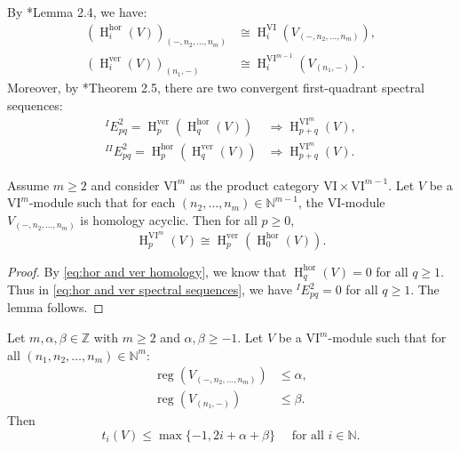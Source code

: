 \documentclass{amsart}
\numberwithin{equation}{section}
\DeclareMathOperator{\reg}{reg}
\DeclareMathOperator{\HH}{H}
\newcommand{\N}{{\mathbb{N}}}
\newcommand{\hor}{{\mathrm{hor}}}
\newcommand{\ver}{{\mathrm{ver}}}
\newcommand{\VI}{{\mathrm{VI}}}
\begin{document}
By \cite{gta}*{Lemma 2.4}, we have:
   \begin{equation} \label{eq:hor and ver homology}
      \begin{aligned}
         (\HH^\hor_i (V))_{(-, n_2, \ldots, n_m)} &\cong \HH^{\VI}_i(V_{(-, n_2, \ldots, n_m)}),\\
         (\HH^\ver_i (V))_{(n_1, -)} &\cong \HH^{\VI^{m-1}}_i(V_{(n_1, -)}).
      \end{aligned}
   \end{equation}
Moreover, by \cite{gta}*{Theorem 2.5}, there are two convergent first-quadrant spectral sequences:
   \begin{equation} \label{eq:hor and ver spectral sequences}
      \begin{aligned}
         ^{I}\!E^2_{pq} = \HH^\ver_p (\HH^\hor_q (V)) &\Rightarrow \HH^{\VI^m}_{p+q}(V),\\
         ^{II}\!E^2_{pq} = \HH^\hor_p (\HH^\ver_q (V)) &\Rightarrow \HH^{\VI^m}_{p+q}(V).
      \end{aligned}
   \end{equation}

\begin{lemma} \label{lem: spec seq degenerate}
   Assume $m\geqslant 2$ and consider $\VI^m$ as the product category $\VI\times \VI^{m-1}$. Let $V$ be a $\VI^m$-module such that for each $(n_2, \ldots, n_m)\in \N^{m-1}$, the $\VI$-module $V_{(-, n_2, \ldots, n_m)}$ is homology acyclic. Then for all $p\geqslant 0$, 
   \[ \HH^{\VI^m}_p(V) \cong \HH_p^\ver (\HH_0^\hor(V)). \]
\end{lemma}

\begin{proof}
   By \eqref{eq:hor and ver homology}, we know that $\HH^\hor_q(V)=0$ for all $q\geqslant 1$. Thus in \eqref{eq:hor and ver spectral sequences}, we have $^{I}\!E^2_{pq}=0$ for all $q\geqslant 1$. The lemma follows.
\end{proof}


\begin{proposition} \label{prop: bound ti by 2i}
   Let $m, \alpha, \beta\in \mathbb{Z}$ with $m\geqslant 2$ and $\alpha, \beta\geqslant -1$. Let $V$ be a $\VI^m$-module such that for all $(n_1, n_2, \ldots, n_m)\in \N^m$:
   \begin{align*}
      \reg\left(V_{(-, n_2, \ldots, n_m)}\right) &\leqslant \alpha,\\
      \reg\left(V_{(n_1, -)}\right) &\leqslant \beta.
   \end{align*} 
   Then 
   \[ t_i(V) \leqslant \max\{-1, 2i + \alpha + \beta\} \quad \mbox{ for all }i\in \N. \]
\end{proposition}
\end{document}
